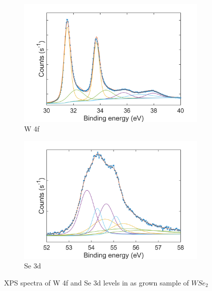 \begin{figure}[!h]
	\begin{center}
		\begin{subfigure}[b]{1\textwidth}
			\includegraphics[scale=0.35]{1T'/XPSW4fPre.png}
			\caption{W 4f}
			\label{fig:1T'XPSW4fPreSpectrum}
		\end{subfigure}
		\qquad
		\begin{subfigure}[b]{1\textwidth}
			\includegraphics[scale=0.35]{1T'/XPSSe3dPre.png}
			\caption{Se 3d}
			\label{fig:1T'XPSSe3dPreSpectrum}
		\end{subfigure}
		\caption{XPS spectra of W 4f and Se 3d levels in as grown sample of $WSe_2$}
		\label{fig:1T'XPSPreSpectra}
	\end{center}
\end{figure}

